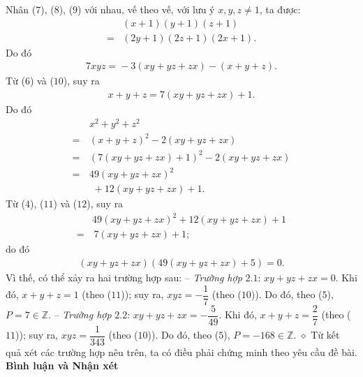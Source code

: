 \begin{multicols}{2}
	Nhân ($7$), ($8$), ($9$) với nhau, vế theo vế, với lưu ý $x, y, z \ne 1$, ta được:
	\begin{align*}
		&\left( {x + 1} \right)\left( {y + 1} \right)\left( {z + 1} \right) \\
		= &\left( {2y + 1} \right)\left( {2z + 1} \right)\left( {2x + 1} \right).
	\end{align*}
	Do đó
	\begin{align*}
		7xyz \!=\!  -\! 3\left( {xy \!+\! yz \!+\! zx} \right) \!-\! \left( {x \!+\! y \!+\! z} \right). \tag{$10$}
	\end{align*}
	Từ ($6$) và ($10$), suy ra
	\begin{align*}
		x + y + z = 7\left( {xy + yz + zx} \right) + 1. \tag{$11$}
	\end{align*}
	Do đó
	\begin{align*}
		&{x^2} + {y^2} + {z^2} \\
		= \,&{\left( {x + y + z} \right)^2} - 2\left( {xy + yz + zx} \right) \\
		= \,&{\left( {7\left( {xy + yz + zx} \right) + 1} \right)^2} - 2\left( {xy + yz + zx} \right)\\
		= \,&49{\left( {xy + yz + zx} \right)^2}\\
		 &\,\,+ 12\left( {xy + yz + zx} \right) + 1. \tag{$12$}
	\end{align*}
	Từ ($4$), ($11$) và ($12$), suy ra
	\begin{align*}
		&49{\left( {xy + yz + zx} \right)^2} + 12\left( {xy + yz + zx} \right) + 1 \\
		= &\,7\left( {xy + yz + zx} \right) + 1;
	\end{align*}
	do đó
	\begin{align*}
		\left( {xy + yz + zx} \right)\left( {49\left( {xy + yz + zx} \right) + 5} \right) = 0.
	\end{align*}
	Vì thế, có thể xảy ra hai trường hợp sau:
	\vskip 0.05cm
	-- \textit{Trường hợp} $2.1$: $xy + yz + zx = 0$.
	\vskip 0.05cm
	Khi đó, $x + y + z = 1$  (theo ($11$)); suy ra, $xyz = - \dfrac{1}{7}$  (theo ($10$)).
	\vskip 0.05cm
	Do đó, theo ($5$),  $P = 7 \in \mathbb{Z}$.
	\vskip 0.05cm
	-- \textit{Trường hợp} $2.2$: $xy + yz + zx = - \dfrac{5}{49}$.
	\vskip 0.05cm  
	Khi đó, $x + y + z = \dfrac{2}{7}$  (theo ($11$)); suy ra, $xyz = \dfrac{1}{343}$  (theo ($10$)).
	\vskip 0.05cm
	Do đó, theo ($5$),  $P = -168 \in \mathbb{Z}$.
	\vskip 0.05cm
	$\diamond$ Từ kết quả xét các trường hợp nêu trên, ta có điều phải chứng minh theo yêu cầu đề bài.
	\vskip 0.05cm
	\textbf{\color{thachthuctoanhoc}Bình luận và Nhận xét}

\end{multicols}
